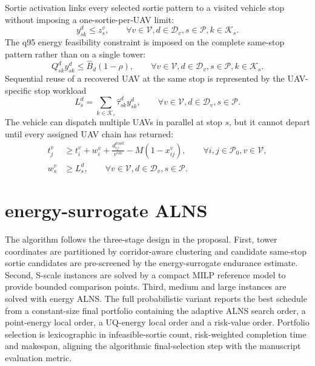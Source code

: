 \documentclass[preprint,12pt,number]{elsarticle}
\newcommand{\rev}[1]{{\color{blue}#1}}
\newenvironment{revblock}{\begingroup\color{blue}}{\endgroup}
\begin{document}
\begin{revblock}
Sortie activation links every selected sortie pattern to a visited vehicle stop without imposing a one-sortie-per-UAV limit:
\begin{equation}
y^d_{sk} \leq z_s^v,\qquad \forall v\in\mathcal{V}, d\in\mathcal{D}_v, s\in\mathcal{P}, k\in\mathcal{K}_s.
\label{eq:sortie-activation}
\end{equation}
The q95 energy feasibility constraint is imposed on the complete same-stop pattern rather than on a single tower:
\begin{equation}
Q^d_{sk} y^d_{sk} \leq \hat B_d(1-\rho),\qquad \forall v\in\mathcal{V}, d\in\mathcal{D}_v, s\in\mathcal{P}, k\in\mathcal{K}_s.
\label{eq:endurance}
\end{equation}
Sequential reuse of a recovered UAV at the same stop is represented by the UAV-specific stop workload
\begin{equation}
L_s^d=\sum_{k\in\mathcal{K}_s}\hat\tau^d_{sk}y^d_{sk},\qquad \forall v\in\mathcal{V}, d\in\mathcal{D}_v, s\in\mathcal{P}.
\label{eq:uav-chain}
\end{equation}
The vehicle can dispatch multiple UAVs in parallel at stop $s$, but it cannot depart until every assigned UAV chain has returned:
\begin{align}
t_j^v &\geq t_i^v+w_i^v+\frac{d^{\mathrm{road}}_{ij}}{v^{\mathrm{car}}}-M(1-x^v_{ij}),
\qquad \forall i,j\in\mathcal{P}_0,v\in\mathcal{V},
\label{eq:time-propagation}\\
w_s^v &\geq L_s^d,\qquad \forall v\in\mathcal{V},d\in\mathcal{D}_v,s\in\mathcal{P}.
\label{eq:launch-recovery-sync}
\end{align}
\end{revblock}

\section{energy-surrogate ALNS}
\label{sec:algorithm}

The algorithm follows the three-stage design in the proposal. First, tower coordinates are partitioned by corridor-aware clustering and candidate same-stop sortie candidates are pre-screened by the energy-surrogate endurance estimate. Second, S-scale instances are solved by a compact MILP reference model to provide bounded comparison points. Third, medium and large instances are solved with energy ALNS. \rev{The full probabilistic variant reports the best schedule from a constant-size final portfolio containing the adaptive ALNS search order, a point-energy local order, a UQ-energy local order and a risk-value order. Portfolio selection is lexicographic in infeasible-sortie count, risk-weighted completion time and makespan, aligning the algorithmic final-selection step with the manuscript evaluation metric.}
\end{document}
